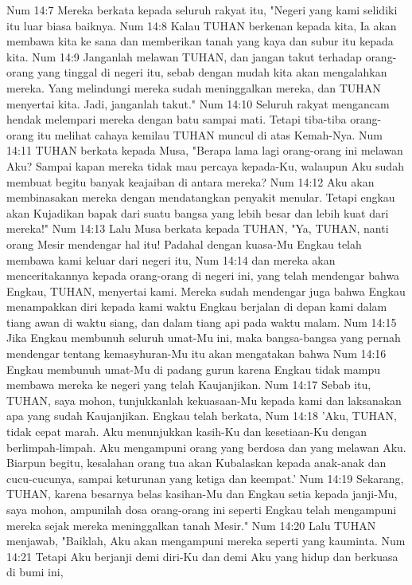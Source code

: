 Num 14:7  Mereka berkata kepada seluruh rakyat itu, "Negeri yang kami selidiki itu luar biasa baiknya.
Num 14:8  Kalau TUHAN berkenan kepada kita, Ia akan membawa kita ke sana dan memberikan tanah yang kaya dan subur itu kepada kita.
Num 14:9  Janganlah melawan TUHAN, dan jangan takut terhadap orang-orang yang tinggal di negeri itu, sebab dengan mudah kita akan mengalahkan mereka. Yang melindungi mereka sudah meninggalkan mereka, dan TUHAN menyertai kita. Jadi, janganlah takut."
Num 14:10  Seluruh rakyat mengancam hendak melempari mereka dengan batu sampai mati. Tetapi tiba-tiba orang-orang itu melihat cahaya kemilau TUHAN muncul di atas Kemah-Nya.
Num 14:11  TUHAN berkata kepada Musa, "Berapa lama lagi orang-orang ini melawan Aku? Sampai kapan mereka tidak mau percaya kepada-Ku, walaupun Aku sudah membuat begitu banyak keajaiban di antara mereka?
Num 14:12  Aku akan membinasakan mereka dengan mendatangkan penyakit menular. Tetapi engkau akan Kujadikan bapak dari suatu bangsa yang lebih besar dan lebih kuat dari mereka!"
Num 14:13  Lalu Musa berkata kepada TUHAN, "Ya, TUHAN, nanti orang Mesir mendengar hal itu! Padahal dengan kuasa-Mu Engkau telah membawa kami keluar dari negeri itu,
Num 14:14  dan mereka akan menceritakannya kepada orang-orang di negeri ini, yang telah mendengar bahwa Engkau, TUHAN, menyertai kami. Mereka sudah mendengar juga bahwa Engkau menampakkan diri kepada kami waktu Engkau berjalan di depan kami dalam tiang awan di waktu siang, dan dalam tiang api pada waktu malam.
Num 14:15  Jika Engkau membunuh seluruh umat-Mu ini, maka bangsa-bangsa yang pernah mendengar tentang kemasyhuran-Mu itu akan mengatakan bahwa
Num 14:16  Engkau membunuh umat-Mu di padang gurun karena Engkau tidak mampu membawa mereka ke negeri yang telah Kaujanjikan.
Num 14:17  Sebab itu, TUHAN, saya mohon, tunjukkanlah kekuasaan-Mu kepada kami dan laksanakan apa yang sudah Kaujanjikan. Engkau telah berkata,
Num 14:18  'Aku, TUHAN, tidak cepat marah. Aku menunjukkan kasih-Ku dan kesetiaan-Ku dengan berlimpah-limpah. Aku mengampuni orang yang berdosa dan yang melawan Aku. Biarpun begitu, kesalahan orang tua akan Kubalaskan kepada anak-anak dan cucu-cucunya, sampai keturunan yang ketiga dan keempat.'
Num 14:19  Sekarang, TUHAN, karena besarnya belas kasihan-Mu dan Engkau setia kepada janji-Mu, saya mohon, ampunilah dosa orang-orang ini seperti Engkau telah mengampuni mereka sejak mereka meninggalkan tanah Mesir."
Num 14:20  Lalu TUHAN menjawab, "Baiklah, Aku akan mengampuni mereka seperti yang kauminta.
Num 14:21  Tetapi Aku berjanji demi diri-Ku dan demi Aku yang hidup dan berkuasa di bumi ini,
